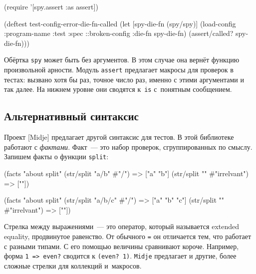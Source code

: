 \begin{english}
  \begin{clojure}
(require '[spy.assert :as assert])

(deftest test-config-error-die-fn-called
  (let [spy-die-fn (spy/spy)]
    (load-config {:program-name :test
                  :spec ::broken-config
                  :die-fn spy-die-fn})
    (assert/called? spy-die-fn)))
  \end{clojure}
\end{english}

Обёртка \verb|spy| может быть без аргументов. В этом случае она вернёт
функцию произвольной арности. Модуль \verb|assert| предлагает макросы для
проверок в тестах: вызвано хотя бы раз, точное число раз, именно с этими
аргументами и так далее. На нижнем уровне они сводятся к~\verb|is| с~понятным
сообщением.

\subsection{Альтернативный синтаксис}


Проект [Midje] предлагает другой
синтаксис для тестов. В этой библиотеке работают с \emph{фактами}. Факт~--- это
набор проверок, сгруппированных по смыслу. Запишем факты о функции
\verb|split|:

\ifx\devicetype\mobile

\begin{english}
  \begin{clojure}
(facts "about split"
 (str/split "a/b" #"/") => ["a" "b"]
 (str/split "" #"irrelvant") => [""])
  \end{clojure}
\end{english}

\else

\begin{english}
  \begin{clojure}
(facts "about split"
 (str/split "a/b/c" #"/") => ["a" "b" "c"]
 (str/split "" #"irrelvant") => [""])
  \end{clojure}
\end{english}

\fi


Стрелка между выражениями~--- это оператор, который называется extended
equality, продвинутое равенство. От обычного \verb|=| он отличается тем, что
работает с разными типами. С его помощью величины сравнивают короче. Например,
форма \verb|1 => even?| сводится к \verb|(even? 1)|. \verb|Midje| предлагает и
другие, более сложные стрелки для коллекций и~макросов.

